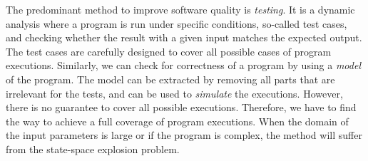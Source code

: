 The predominant method to improve software quality is
\emph{testing}. It is a dynamic analysis where a program is run under specific conditions, so-called test cases, and checking
whether the result with a given input matches the expected output.
%
The test cases are carefully designed to cover all possible cases of program executions.
%
Similarly, we can check for correctness of a program by using a \emph{model} of the program. The model can be extracted by
removing all parts that are irrelevant for the tests, and can be used
to \emph{simulate} the executions. However, there is no guarantee to cover all possible executions. Therefore, we have to find the way to achieve a full coverage of program executions. When the domain of the input parameters is large or if the program is
complex, the method will suffer from the state-space explosion
problem.%
%




%
\newpage
%

